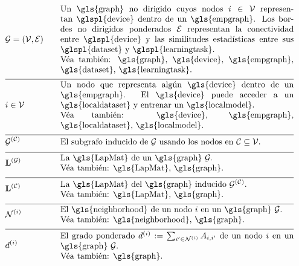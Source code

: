 \begin{align}
	&\graph = \pair{\nodes}{\edges} & \quad & \parbox{.80\textwidth}{Un \gls{graph} no dirigido cuyos nodos $\nodeidx \in \nodes$ representan 
	   \glspl{device} dentro de un \gls{empgraph}. Los bordes no dirigidos ponderados $\edges$ representan la conectividad entre 
	   \glspl{device} y las similitudes estadísticas entre sus \glspl{dataset} y \glspl{learningtask}.
	   \\ Véa también: \gls{graph}, \gls{device}, \gls{empgraph}, \gls{dataset}, \gls{learningtask}.} \nonumber \\[2mm] \hline \nonumber\\[-5mm]
   &\nodeidx \in \nodes& \quad & \parbox{.80\textwidth}{Un nodo que representa algún 
	   \gls{device} dentro de un \gls{empgraph}. El \gls{device} puede acceder a un \gls{localdataset} y entrenar un \gls{localmodel}.
	   \\ Véa también: \gls{device}, \gls{empgraph}, \gls{localdataset}, \gls{localmodel}.} \nonumber \\[2mm] \hline \nonumber\\[-5mm]
   &\indsubgraph{\graph}{\cluster}& \quad & \parbox{.80\textwidth}{El subgrafo inducido de $\graph$ usando los nodos en $\cluster \subseteq \nodes$.} \nonumber \\[2mm] \hline \nonumber\\[-5mm]
   &\LapMat{\graph}   & \quad & \parbox{.80\textwidth}{La \gls{LapMat} de un \gls{graph} $\graph$.
	   \\ Véa también: \gls{LapMat}, \gls{graph}.} \nonumber \\[2mm] \hline \nonumber\\[-5mm]
   &\LapMat{\cluster}   & \quad & \parbox{.80\textwidth}{La \gls{LapMat} del \gls{graph} inducido $\indsubgraph{\graph}{\cluster}$.
	   \\ Véa también: \gls{LapMat}, \gls{graph}.} \nonumber \\[2mm] \hline \nonumber\\[-5mm]
   &\neighbourhood{\nodeidx}  & \quad & \parbox{.80\textwidth}{El \gls{neighborhood} de un nodo $\nodeidx$ en un \gls{graph} $\graph$.
	   \\ Véa también: \gls{neighborhood}, \gls{graph}.} \nonumber \\[2mm] \hline \nonumber\\[-5mm]
   &\nodedegree{\nodeidx} & \quad & \parbox{.80\textwidth}{El grado ponderado $\nodedegree{\nodeidx}\defeq \sum_{\nodeidx' \in \neighbourhood{\nodeidx}} \edgeweight_{\nodeidx,\nodeidx'}$ 
	   de un nodo $\nodeidx$ en un \gls{graph} $\graph$.
	   \\ Véa también: \gls{graph}.} \nonumber 
\end{align} 

